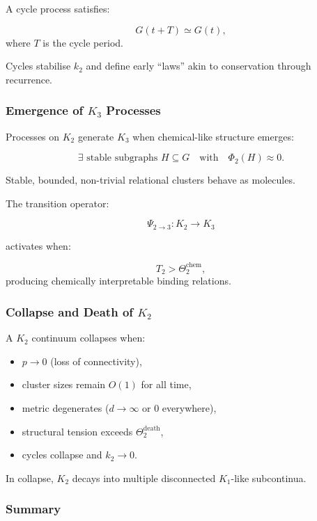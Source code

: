 A cycle process satisfies:

\[
G(t + T) \simeq G(t),
\]
where $T$ is the cycle period.

Cycles stabilise $k_2$ and define early “laws” akin to conservation
through recurrence.

\subsubsection{Emergence of \texorpdfstring{$K_3$}{K_3} Processes}

Processes on $K_2$ generate $K_3$ when chemical-like structure emerges:

\[
\exists \text{ stable subgraphs } H \subseteq G
\quad
\text{with}
\quad
\Phi_2(H) \approx 0.
\]

Stable, bounded, non-trivial relational clusters behave as molecules.

The transition operator:

\[
\Psi_{2\to3}: K_2 \to K_3
\]

activates when:

\[
T_2 > \Theta_2^{\text{chem}},
\]
producing chemically interpretable binding relations.

\subsubsection{Collapse and Death of \texorpdfstring{$K_2$}{K_2}}

A $K_2$ continuum collapses when:

\begin{itemize}
    \item $p \to 0$ (loss of connectivity),
    \item cluster sizes remain $O(1)$ for all time,
    \item metric degenerates ($d \to \infty$ or $0$ everywhere),
    \item structural tension exceeds $\Theta_2^{\text{death}}$,
    \item cycles collapse and $k_2 \to 0$.
\end{itemize}

In collapse, $K_2$ decays into multiple disconnected $K_1$-like
subcontinua.

\subsubsection{Summary}


